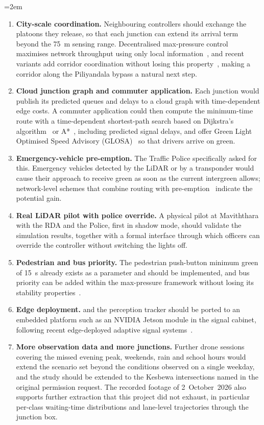 {\emergencystretch=2em
\begin{enumerate}[leftmargin=*]
\item \textbf{City-scale coordination.} Neighbouring \prism{} controllers should exchange the platoons they release, so that each junction can extend its arrival term beyond the 75~m sensing range. Decentralised max-pressure control maximises network throughput using only local information~\cite{varaiya2013maxpressure,wongpiromsarn2012distributed}, and recent variants add corridor coordination without losing this property~\cite{xu2024smoothingmp}, making a corridor along the Piliyandala bypass a natural next step.
\item \textbf{Cloud junction graph and commuter application.} Each junction would publish its predicted queues and delays to a cloud graph with time-dependent edge costs. A commuter application could then compute the minimum-time route with a time-dependent shortest-path search based on Dijkstra's algorithm~\cite{dijkstra1959} or A*~\cite{hart1968astar}, including predicted signal delays, and offer Green Light Optimised Speed Advisory (GLOSA)~\cite{katsaros2011glosa} so that drivers arrive on green.
\item \textbf{Emergency-vehicle pre-emption.} The Traffic Police specifically asked for this. Emergency vehicles detected by the LiDAR or by a transponder would cause their approach to receive green as soon as the current intergreen allows; network-level schemes that combine routing with pre-emption~\cite{su2022emvlight} indicate the potential gain.
\item \textbf{Real LiDAR pilot with police override.} A physical pilot at Maviththara with the RDA and the Police, first in shadow mode, should validate the simulation results, together with a formal interface through which officers can override the controller without switching the lights off.
\item \textbf{Pedestrian and bus priority.} The pedestrian push-button minimum green of 15~s already exists as a parameter and should be implemented, and bus priority can be added within the max-pressure framework without losing its stability properties~\cite{xu2022tspmaxpressure}.
\item \textbf{Edge deployment.} \prism{} and the perception tracker should be ported to an embedded platform such as an NVIDIA Jetson module in the signal cabinet, following recent edge-deployed adaptive signal systems~\cite{raza2025edgeatlc}.
\item \textbf{More observation data and more junctions.} Further drone sessions covering the missed evening peak, weekends, rain and school hours would extend the scenario set beyond the conditions observed on a single weekday, and the study should be extended to the Kesbewa intersections named in the original permission request. The recorded footage of 2~October~2026 also supports further extraction that this project did not exhaust, in particular per-class waiting-time distributions and lane-level trajectories through the junction box.

\end{enumerate}}
